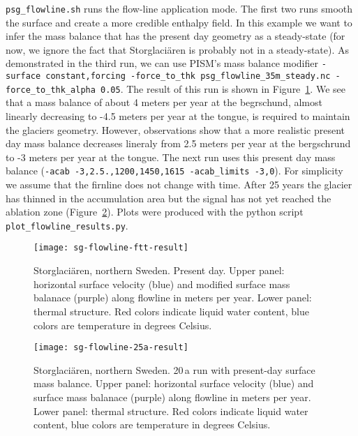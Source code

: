 \texttt{psg_flowline.sh} runs the flow-line application mode. The first two runs smooth the surface and create a more credible enthalpy field. In this example we want to infer the mass balance that has the present day geometry as a steady-state (for now, we ignore the fact that Storglaci{\"a}ren is probably not in a steady-state). As demonstrated in the third run, we can use PISM's mass balance modifier \texttt{-surface constant,forcing -force_to_thk psg_flowline_35m_steady.nc -force_to_thk_alpha 0.05}. The result of this run is shown in Figure~\ref{fig:storglaciaren-ftt-result}. We see that a mass balance of about 4 meters per year at the begrschund, almost linearly decreasing to -4.5 meters per year at the tongue, is required to maintain the glaciers geometry. However, observations show that a more realistic present day mass balance decreases lineraly from 2.5 meters per year at the bergschrund to -3 meters per year at the tongue. The next run uses this present day mass balance (\texttt{-acab -3,2.5.,1200,1450,1615 -acab_limits -3,0}). For simplicity we assume that the firnline does not change with time. After 25 years the glacier has thinned in the accumulation area but the signal has not yet reached the ablation zone (Figure~\ref{fig:storglaciaren-25a-result}). Plots were produced with the python script \texttt{plot_flowline_results.py}.

\begin{figure}[ht]
  \centering
  \texttt{[image: sg-flowline-ftt-result]}
  \caption{Storglaci{\"a}ren, northern Sweden. Present day. Upper panel: horizontal surface velocity (blue) and modified surface mass balanace (purple) along flowline in meters per year. Lower panel: thermal structure. Red colors indicate liquid water content, blue colors are temperature in degrees Celsius.}
  \label{fig:storglaciaren-ftt-result}
\end{figure}

\begin{figure}[ht]
  \centering
  \texttt{[image: sg-flowline-25a-result]}
  \caption{Storglaci{\"a}ren, northern Sweden. 20\,a run with present-day surface mass balance. Upper panel: horizontal surface velocity (blue) and surface mass balanace (purple) along flowline in meters per year. Lower panel: thermal structure. Red colors indicate liquid water content, blue colors are temperature in degrees Celsius.}
  \label{fig:storglaciaren-25a-result}
\end{figure}
